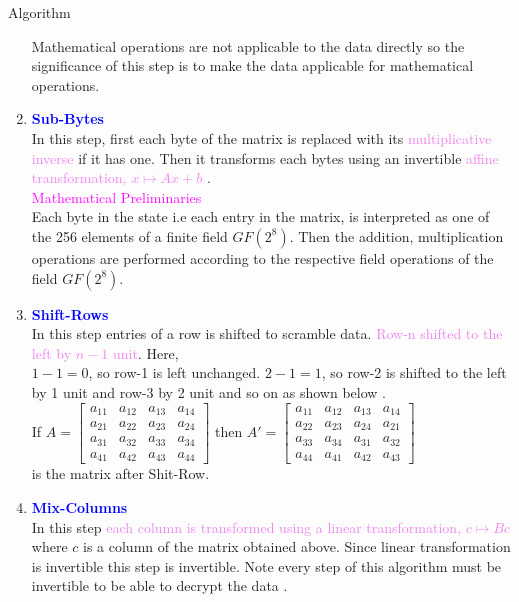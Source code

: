 \documentclass{beamer}
\begin{document}
\begin{frame}[allowframebreaks]{Algorithm}
\begin{enumerate}
    Mathematical operations are not applicable to the data directly so the significance of this step is to make the data applicable for mathematical operations.
  \item \textbf{\textcolor{blue}{Sub-Bytes}}\\
    In this step, first each byte of the matrix is replaced with its \textcolor{violet}{multiplicative inverse} if it has one. Then it transforms each bytes using an invertible \textcolor{violet}{affine transformation, \(x \mapsto Ax+b\)} \cite{aes}.\\
    \framebreak
    \textcolor{magenta}{Mathematical Preliminaries}\\
    Each byte in the state i.e each entry in the matrix, is interpreted as one of the 256 elements of a finite field \(GF(2^8)\). Then the addition, multiplication operations are performed according to the respective field operations of the field \(GF(2^8)\).
\vspace{2mm}
    \item \textbf{\textcolor{blue}{Shift-Rows}}\\
In this step entries of a row is shifted to scramble data. \textcolor{violet}{Row-n shifted to the left by \(n-1\) unit}. Here,\\
\(1-1=0\), so row-1 is left unchanged. \(2-1=1\), so row-2 is shifted to the left by 1 unit and row-3 by 2 unit and so on as shown below \cite{aes}.\\
\vspace{3mm}
If \(A=\begin{bmatrix}
    a_{11}&a_{12}&a_{13}&a_{14}\\
    a_{21}&a_{22}&a_{23}&a_{24}\\
    a_{31}&a_{32}&a_{33}&a_{34}\\
    a_{41}&a_{42}&a_{43}&a_{44}
    \end{bmatrix}\) \hspace{3mm} then \(A'=\begin{bmatrix}
    a_{11}&a_{12}&a_{13}&a_{14}\\
    a_{22}&a_{23}&a_{24}&a_{21}\\
    a_{33}&a_{34}&a_{31}&a_{32}\\
    a_{44}&a_{41}&a_{42}&a_{43}
  \end{bmatrix}\) \vspace{2mm} \\[3mm] is the matrix after Shit-Row.

    \framebreak

  \item \textbf{\textcolor{blue}{Mix-Columns}}\\
    In this step \textcolor{violet}{each column is transformed using a linear transformation, \(c \mapsto Bc\)} where \(c\) is a column of the matrix obtained above. Since linear transformation is invertible this step is invertible. Note every step of this algorithm must be invertible to be able to decrypt the data \cite{aes}.


\end{enumerate}
\end{frame}
\end{document}
